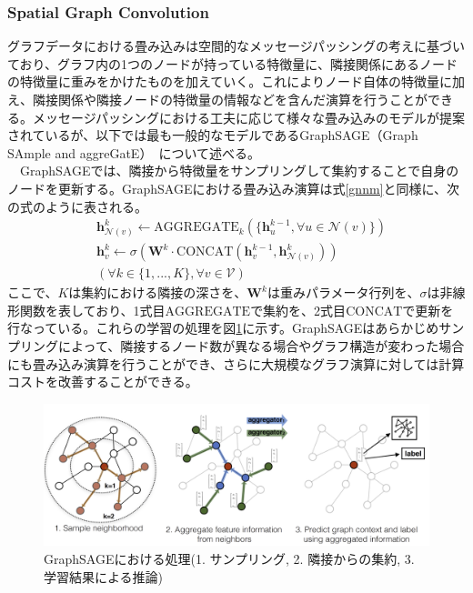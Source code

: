 \subsubsection{Spatial Graph Convolution}
グラフデータにおける畳み込みは空間的なメッセージパッシングの考えに基づいており、グラフ内の1つのノードが持っている特徴量に、隣接関係にあるノードの特徴量に重みをかけたものを加えていく。これによりノード自体の特徴量に加え、隣接関係や隣接ノードの特徴量の情報などを含んだ演算を行うことができる。メッセージパッシングにおける工夫に応じて様々な畳み込みのモデルが提案されているが、以下では最も一般的なモデルであるGraphSAGE（Graph SAmple and aggreGatE）~\cite{graphsage}について述べる。\\
　GraphSAGEでは、隣接から特徴量をサンプリングして集約することで自身のノードを更新する。GraphSAGEにおける畳み込み演算は式\ref{gnnm}と同様に、次の式のように表される。\\
\begin{align}
&\bm{h}_{\mathcal{N}(v)}^k \leftarrow \mathrm{AGGREGATE}_k(\{ \bm{h}_u^{k-1}, \forall u \in \mathcal{N}(v) \})\\
&\bm{h}_v^k \leftarrow \sigma (\bm{W}^k \cdot \mathrm{CONCAT}(\bm{h}_v^{k-1}, \bm{h}_{\mathcal{N}(v)}^k))\\
&  (\forall k \in \{1, ..., K\}, \forall v \in \mathcal{V}) \nonumber
\end{align}
ここで、$K$は集約における隣接の深さを、$\bm{W}^k$は重みパラメータ行列を、$\sigma$は非線形関数を表しており、1式目$\mathrm{AGGREGATE}$で集約を、2式目$\mathrm{CONCAT}$で更新を行なっている。これらの学習の処理を図\ref{sage}に示す。GraphSAGEはあらかじめサンプリングによって、隣接するノード数が異なる場合やグラフ構造が変わった場合にも畳み込み演算を行うことができ、さらに大規模なグラフ演算に対しては計算コストを改善することができる。
\begin{figure}[H]
	\begin{center}
 \includegraphics[keepaspectratio, scale=0.3]
 	{Figure/Deeplearning/sage.png}
 		\caption[GraphSAGE]{GraphSAGEにおける処理(1. サンプリング, 2. 隣接からの集約, 3. 学習結果による推論)~\cite{graphsage}}
 		\label{sage}
	\end{center}
\end{figure}
